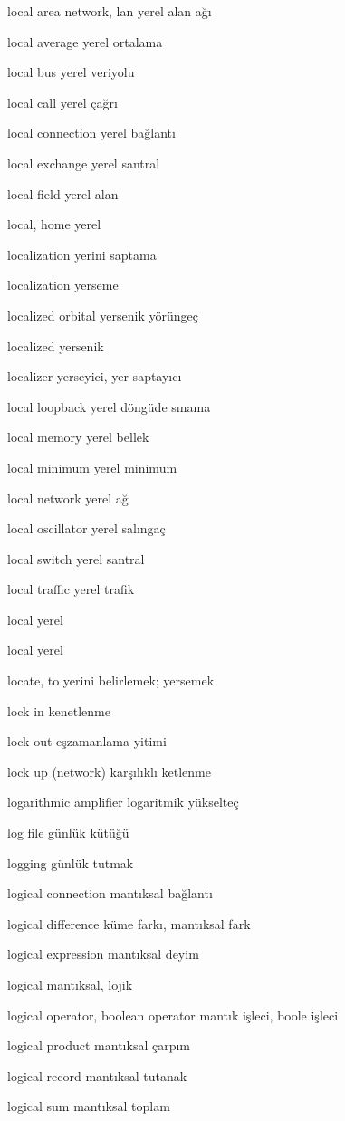 \documentclass[12pt,fleqn]{article}\usepackage{../../common}
\begin{document}
local area network, lan yerel alan ağı

local average yerel ortalama

local bus yerel veriyolu

local call yerel çağrı

local connection yerel bağlantı

local exchange yerel santral

local field yerel alan

local, home yerel

localization yerini saptama

localization yerseme

localized orbital yersenik yörüngeç

localized yersenik

localizer yerseyici, yer saptayıcı

local loopback yerel döngüde sınama

local memory yerel bellek

local minimum yerel minimum

local network yerel ağ

local oscillator yerel salıngaç

local switch yerel santral

local traffic yerel trafik

local yerel

local yerel

locate, to yerini belirlemek; yersemek

lock in kenetlenme

lock out eşzamanlama yitimi

lock up (network) karşılıklı ketlenme

logarithmic amplifier logaritmik yükselteç

log file günlük kütüğü

logging günlük tutmak

logical connection mantıksal bağlantı

logical difference küme farkı, mantıksal fark

logical expression mantıksal deyim

logical mantıksal, lojik

logical operator, boolean operator mantık işleci, boole işleci

logical product mantıksal çarpım

logical record mantıksal tutanak

logical sum mantıksal toplam
\end{document}
